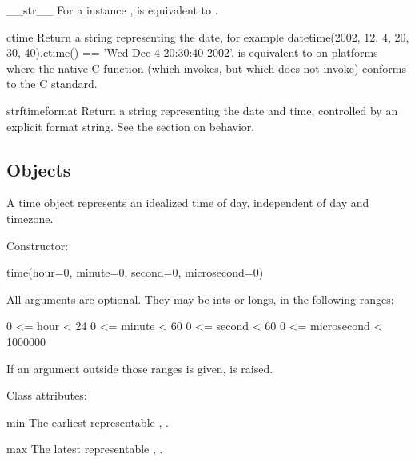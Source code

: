 \begin{methoddesc}{__str__}{}
    For a  instance ,  is
    equivalent to .
\end{methoddesc}

\begin{methoddesc}{ctime}{}
    Return a string representing the date, for example
    datetime(2002, 12, 4, 20, 30, 40).ctime() == 'Wed Dec  4 20:30:40 2002'.
     is equivalent to
     on platforms where
    the native C  function (which
     invokes, but which
     does not invoke) conforms to the C
    standard.
\end{methoddesc}

\begin{methoddesc}{strftime}{format}
    Return a string representing the date and time, controlled by an
    explicit format string.  See the section on 
    behavior.
\end{methoddesc}


\subsection{ Objects \label{datetime-time}}

A time object represents an idealized time of day, independent of day
and timezone.

Constructor:

    time(hour=0, minute=0, second=0, microsecond=0)

    All arguments are optional.  They may be ints or longs, in the
    following ranges:

        0 <= hour < 24
        0 <= minute < 60
        0 <= second < 60
        0 <= microsecond < 1000000

    If an argument outside those ranges is given,
     is raised.

Class attributes:

\begin{memberdesc}{min}
        The earliest representable , .
\end{memberdesc}

\begin{memberdesc}{max}
        The latest representable , .
\end{memberdesc}

